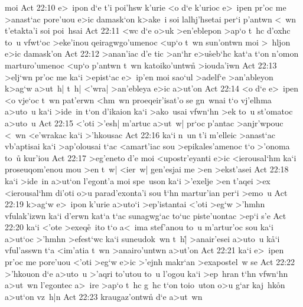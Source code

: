 moi\bibvsend
\vs Act 22:10
e>~ipon
d`e
t'i
poi'hsw
k'urie
<o
d`e
k'urioc
e>~ipen
pr'oc
me
>anast`ac
pore'uou
e>ic
damask`on
k>ake~i
soi
lalhj'hsetai
per`i
p'antwn
<~wn
t'etakta'i
soi
poi~hsai\bibvsend
\vs Act 22:11
<wc
d`e
o>uk
>en'eblepon
>ap`o
t~hc
d'oxhc
to~u
vfwt`oc
>eke'inou
qeiragwgo'umenoc
<up`o
t~wn
sun'ontwn
moi
>~hljon
e>ic
damask'on\bibvsend
\vs Act 22:12
>anan'iac
d'e
tic
>an`hr
e>u\r{s}eb`hc
kat`a
t`on
n'omon
marturo'umenoc
<up`o
p'antwn
t~wn
katoiko'untw\r{n}
>iouda'iwn\bibvsend
\vs Act 22:13
>elj`wn
pr'oc
me
ka`i
>epist`ac
e>~ip'en
moi
sao`ul
>adelf`e
>an'ableyon
k>ag`w
a>ut~h|
t~h|
<'wra|
>an'ebleya
e>ic
a>ut'on\bibvsend
\vs Act 22:14
<o
d`e
e>~ipen
<o
vje`oc
t~wn
pat'erwn
<hm~wn
proeqeir'isat'o
se
gn~wnai
t`o
vj'elhma
a>uto~u
ka`i
>ide~in
t`on
d'ikaion
ka`i
>ako~usai
vfwn`hn
>ek
to~u
st'omatoc
a>uto~u\bibvsend
\vs Act 22:15
<'oti
>'esh|
m'artuc
a>ut~w|
pr`oc
p'antac
>anjr'wpouc
<~wn
<e'wrakac
ka`i
>'hkousac\bibvsend
\vs Act 22:16
ka`i
n~un
t'i
m'elleic
>anast`ac
vb'aptisai
ka`i
>ap'olousai
t`ac
<amart'iac
sou
>epikales'amenoc
t`o
>'onoma
to~u\r{}
kur'iou\bibvsend
\vs Act 22:17
>eg'eneto
d'e
moi
<upostr'eyanti
e>ic
<ierousal`hm
ka`i
proseuqom'enou
mou
>en
t~w|
<ier~w|
gen'esjai
me
>en
>ekst'asei\bibvsend
\vs Act 22:18
ka`i
>ide~in
a>ut`on
l'egont'a
moi
spe~uson
ka`i
>'exelje
>en
t'aqei
>ex
<ierousal`hm
di'oti
o>u
parad'exonta'i
sou
\r{t}`hn
martur'ian
per`i
>emo~u\bibvsend
\vs Act 22:19
k>ag`w
e>~ipon
k'urie
a>uto`i
>ep'istantai
<'oti
>eg`w
>'hmhn
vfulak'izwn
ka`i
d'erwn
kat`a
t`ac
sunagwg`ac
to`uc
piste'uontac
>ep`i
s'e\bibvsend
\vs Act 22:20
ka`i
<'ote
>exeq\r{e}~ito
t`o
a<~ima
stef'anou
to~u
m'artur'oc
sou
ka`i
a>ut`oc
>'hmhn
>efest`wc
ka`i
suneudok~wn
t~h|\r{}
>anair'esei
a>uto~u
k\r{a}`i
vful'asswn
t`a
<im'atia
t~wn
>anairo'untwn
a>ut'on\bibvsend
\vs Act 22:21
ka`i
e>~ipen
pr'oc
me
pore'uou
<'oti
>eg`w
e>ic
>'ejnh
makr`an
>exapostel~w
se\bibvsend
\vs Act 22:22
>'hkouon
d`e
a>uto~u
>'aqri
to'utou
to~u
l'ogou
ka`i
>ep~hran
t`hn
vfwn`hn
a>ut~wn
l'egontec
a>~ire
>ap`o
t~hc
g~hc
t`on
toio~uton
o>u
g`ar
kaj~hk\r{o}n
a>ut`on
vz~h|n\bibvsend
\vs Act 22:23
kraugaz'ontwn\r{}
d`e
a>ut~wn
